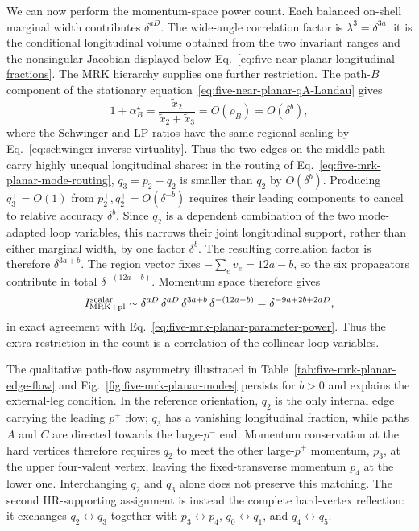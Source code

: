 \documentclass[a4paper,11pt]{article}
\begin{document}
We can now perform the momentum-space power count.  Each balanced on-shell marginal
width contributes \(\delta^{aD}\).  The wide-angle correlation factor is
\(\lambda^3=\delta^{3a}\): it is the conditional longitudinal volume obtained
from the two invariant ranges and the nonsingular Jacobian displayed below
Eq.~\eqref{eq:five-near-planar-longitudinal-fractions}.  The MRK hierarchy
supplies one further restriction.  The path-\(B\) component of the stationary
equation~\eqref{eq:five-near-planar-qA-Landau} gives
\[
 1+\alpha_B^\star
 =\frac{\widetilde x_2}{\widetilde x_2+\widetilde x_3}
 =O(\rho_B)=O(\delta^b),
\]
where the Schwinger and LP ratios have the same regional scaling by
Eq.~\eqref{eq:schwinger-inverse-virtuality}.  Thus the two edges on the middle
path carry highly unequal longitudinal shares: in the routing of
Eq.~\eqref{eq:five-mrk-planar-mode-routing},
\(q_3=p_2-q_2\) is smaller than \(q_2\) by \(O(\delta^b)\).  Producing
\(q_3^+=O(1)\) from \(p_2^+,q_2^+=O(\delta^{-b})\) requires their leading
components to cancel to relative accuracy \(\delta^b\).  Since \(q_2\) is a
dependent combination of the two mode-adapted loop variables, this narrows
their joint longitudinal support, rather than either marginal width, by one
factor \(\delta^b\).  The resulting correlation factor is therefore
\(\delta^{3a+b}\).  The region vector fixes
\(-\sum_e v_e=12a-b\), so the six propagators contribute in total
\(\delta^{-(12a-b)}\).  Momentum space therefore gives
\begin{equation}
 I_{\rm MRK+pl}^{\rm scalar}
 \sim \delta^{aD}\,\delta^{aD}\,
       \delta^{3a+b}\,\delta^{-(12a-b)}
 =\delta^{-9a+2b+2aD},
 \label{eq:five-mrk-planar-momentum-power}
\end{equation}
in exact agreement with Eq.~\eqref{eq:five-mrk-planar-parameter-power}.
Thus the extra restriction in the count is a correlation of the collinear
loop variables.

\pagebreak[3]

The qualitative path-flow asymmetry illustrated in
Table~\ref{tab:five-mrk-planar-edge-flow} and
Fig.~\ref{fig:five-mrk-planar-modes} persists for \(b>0\) and explains the
external-leg condition.
In the reference orientation, \(q_2\) is the only internal edge carrying the
leading \(p^+\) flow; \(q_3\) has a vanishing longitudinal fraction, while
paths \(A\) and \(C\) are directed towards the large-\(p^-\) end.  Momentum
conservation at the hard vertices therefore requires \(q_2\) to meet the
other large-\(p^+\) momentum, \(p_3\), at the upper four-valent vertex,
leaving the fixed-transverse momentum \(p_4\) at the lower one.
Interchanging \(q_2\) and \(q_3\) alone does not preserve this matching.  The
second HR-supporting assignment is instead the complete hard-vertex reflection: it
exchanges \(q_2\leftrightarrow q_3\) together with
\(p_3\leftrightarrow p_4\), \(q_0\leftrightarrow q_1\), and
\(q_4\leftrightarrow q_5\).
\end{document}
